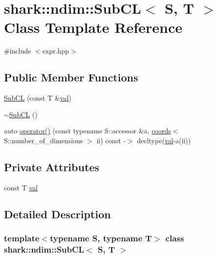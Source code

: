 \hypertarget{classshark_1_1ndim_1_1_sub_c_l}{}\section{shark\+:\+:ndim\+:\+:Sub\+CL$<$ S, T $>$ Class Template Reference}
\label{classshark_1_1ndim_1_1_sub_c_l}


{\ttfamily \#include $<$expr.\+hpp$>$}

\subsection*{Public Member Functions}
\begin{DoxyCompactItemize}
\item 
\hyperlink{classshark_1_1ndim_1_1_sub_c_l_aa164454d7bffa3ef34f998e66458c2c5}{Sub\+CL} (const T \&\hyperlink{classshark_1_1ndim_1_1_sub_c_l_af7420c474cd5adcbbe5672cbef936654}{val})
\item 
\hyperlink{classshark_1_1ndim_1_1_sub_c_l_a8b91fe23f2e54765aee66bc8f74f9385}{$\sim$\+Sub\+CL} ()
\item 
auto \hyperlink{classshark_1_1ndim_1_1_sub_c_l_a14a96380dac9f5135cedb56dee2b7776}{operator()} (const typename S\+::accessor \&a, \hyperlink{structshark_1_1ndim_1_1coords}{coords}$<$ S\+::number\+\_\+of\+\_\+dimensions $>$ ii) const -\/$>$ decltype(\hyperlink{classshark_1_1ndim_1_1_sub_c_l_af7420c474cd5adcbbe5672cbef936654}{val}-\/a(ii))
\end{DoxyCompactItemize}
\subsection*{Private Attributes}
\begin{DoxyCompactItemize}
\item 
const T \hyperlink{classshark_1_1ndim_1_1_sub_c_l_af7420c474cd5adcbbe5672cbef936654}{val}
\end{DoxyCompactItemize}


\subsection{Detailed Description}
\subsubsection*{template$<$typename S, typename T$>$\newline
class shark\+::ndim\+::\+Sub\+C\+L$<$ S, T $>$}

